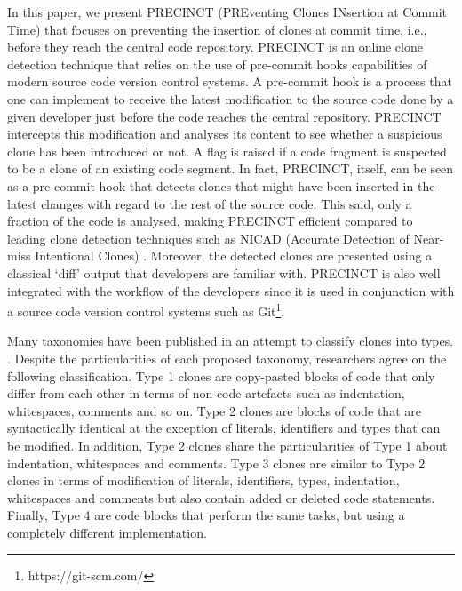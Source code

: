 \documentclass[conference]{IEEEtran}
\begin{document}
In this paper, we present PRECINCT (PREventing Clones INsertion at Commit Time) that focuses on preventing the insertion of clones at commit time, i.e., before they reach the central code repository. PRECINCT is an online clone detection technique that relies on the use of pre-commit hooks capabilities of modern source code version control systems. A pre-commit hook is a process that one can implement to receive the latest modification to the source code done by a given developer just before the code reaches the central repository.
PRECINCT intercepts this modification and analyses its  content to see whether a suspicious clone has been introduced or not.
A flag is raised if a code fragment is suspected to be a clone of an existing code segment.
In fact, PRECINCT, itself, can be seen as a pre-commit hook that detects clones that might have been inserted in the latest changes with regard to the rest of the source code.
This said, only a fraction of the code is analysed, making PRECINCT efficient compared to leading  clone detection techniques such as NICAD (Accurate Detection of Near-miss Intentional Clones) \cite{Cordy2011}.
Moreover, the detected clones are presented using a classical `diff' output that developers are familiar with.
PRECINCT is also well integrated with the workflow of the developers since it is used in conjunction with a source code version control systems such as Git\footnote{https://git-scm.com/}.


Many taxonomies have been published in an attempt to classify clones into types. \cite{Mayrand1996,Balazinska1999,Koschke2006,Bellon2007,NeilDavey,Kontogiannis,Kapser}.
Despite the particularities of each proposed taxonomy, researchers agree on the following classification.
Type 1 clones are copy-pasted blocks of code that only differ from each other in terms of non-code artefacts such as indentation, whitespaces, comments and so on.
Type 2 clones are blocks of code that are syntactically identical at the exception of literals, identifiers and types that can be modified.
In addition, Type 2 clones share the particularities of Type 1 about indentation, whitespaces and comments.
Type 3 clones are similar to Type 2 clones in terms of modification of literals, identifiers, types, indentation, whitespaces and comments but also contain added or deleted code statements.
Finally, Type 4 are code blocks that perform the same tasks, but using a completely different implementation.
\end{document}
